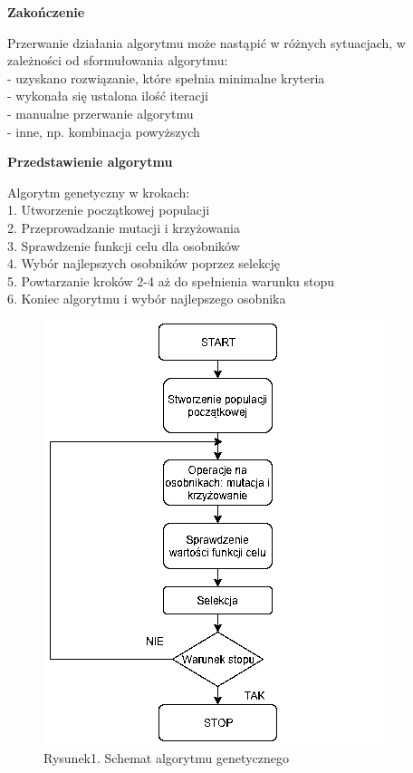 \documentclass[a4paper, twoside, 12pt, justified]{article}
\begin{document}
	
	\begin{center}
		\textbf{Zakończenie}
	\end{center} 	

	Przerwanie działania algorytmu może nastąpić w różnych sytuacjach, w zależności od sformułowania algorytmu:\\
	- uzyskano rozwiązanie, które spełnia minimalne kryteria\\
	- wykonała się ustalona ilość iteracji\\
	- manualne przerwanie algorytmu\\
	- inne, np. kombinacja powyższych\\

 	\begin{large}
 		\begin{center}
 			\textbf{Przedstawienie algorytmu}
 		\end{center}
 	\end{large}
 
	
	Algorytm genetyczny w krokach:\\
	1. Utworzenie początkowej populacji\\
	2. Przeprowadzanie mutacji i krzyżowania\\
	3. Sprawdzenie funkcji celu dla osobników\\
	4. Wybór najlepszych osobników poprzez selekcję\\
	5. Powtarzanie kroków 2-4 aż do spełnienia warunku stopu\\
	6. Koniec algorytmu i wybór najlepszego osobnika
	
	\begin{figure}[h]
		\includegraphics[scale=0.8]{ag}
		\centering
		\\
		{Rysunek1. Schemat algorytmu genetycznego} 
	\end{figure}	
	
\end{document}
